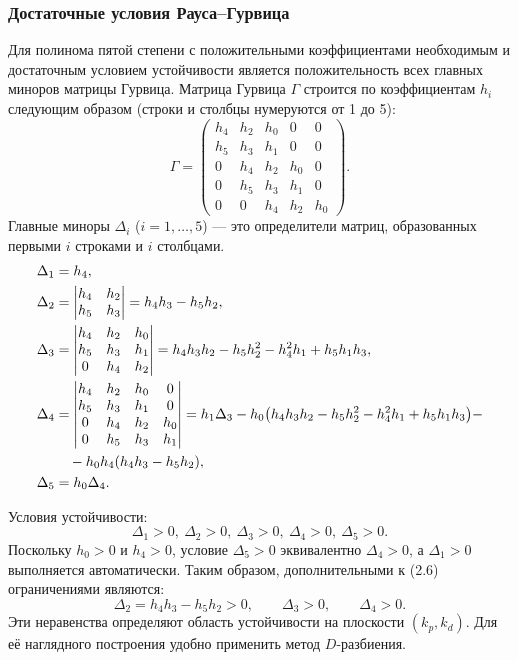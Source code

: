 \documentclass[a4paper, 14pt]{extarticle}
\begin{document}
    \subsubsection{Достаточные условия Рауса–Гурвица}
    Для полинома пятой степени с положительными коэффициентами необходимым и достаточным условием устойчивости является положительность всех главных миноров матрицы Гурвица. Матрица Гурвица $\Gamma$ строится по коэффициентам $h_i$ следующим образом (строки и столбцы нумеруются от 1 до 5):
    \[
    \Gamma = \begin{pmatrix}
    h_4 & h_2 & h_0 & 0 & 0\\
    h_5 & h_3 & h_1 & 0 & 0\\
    0 & h_4 & h_2 & h_0 & 0\\
    0 & h_5 & h_3 & h_1 & 0\\
    0 & 0 & h_4 & h_2 & h_0
    \end{pmatrix}.
    \]
    Главные миноры $\Delta_i$ ($i=1,\ldots,5$) — это определители матриц, образованных первыми $i$ строками и $i$ столбцами.
\begin{align}
    \Delta_1 &= h_4, \\
    \Delta_2 &= \begin{vmatrix} h_4 & h_2 \\ h_5 & h_3 \end{vmatrix} = h_4 h_3 - h_5 h_2, \\
    \Delta_3 &= \begin{vmatrix} h_4 & h_2 & h_0 \\ h_5 & h_3 & h_1 \\ 0 & h_4 & h_2 \end{vmatrix} = h_4 h_3 h_2 - h_5 h_2^2 - h_4^2 h_1 + h_5 h_1 h_3, \\
    \Delta_4 &= \begin{vmatrix} h_4 & h_2 & h_0 & 0 \\ h_5 & h_3 & h_1 & 0 \\ 0 & h_4 & h_2 & h_0 \\ 0 & h_5 & h_3 & h_1 \end{vmatrix} = h_1 \Delta_3 - h_0 \bigl( h_4 h_3 h_2 - h_5 h_2^2 - h_4^2 h_1 + h_5 h_1 h_3 \bigr) - \notag \\
    &\quad - h_0 h_4 (h_4 h_3 - h_5 h_2), \\
    \Delta_5 &= h_0 \Delta_4.
\end{align}

    Условия устойчивости:
    \[
    \Delta_1 > 0,\ \Delta_2 > 0,\ \Delta_3 > 0,\ \Delta_4 > 0,\ \Delta_5 > 0.
    \]
    Поскольку $h_0>0$ и $h_4>0$, условие $\Delta_5>0$ эквивалентно $\Delta_4>0$, а $\Delta_1>0$ выполняется автоматически. Таким образом, дополнительными к (2.6) ограничениями являются:
    \[
    \Delta_2 = h_4 h_3 - h_5 h_2 > 0, \qquad
    \Delta_3 > 0, \qquad
    \Delta_4 > 0. \tag{2.7}
    \]
    Эти неравенства определяют область устойчивости на плоскости $(k_p,k_d)$. Для её наглядного построения удобно применить метод $D$-разбиения.
\end{document}
